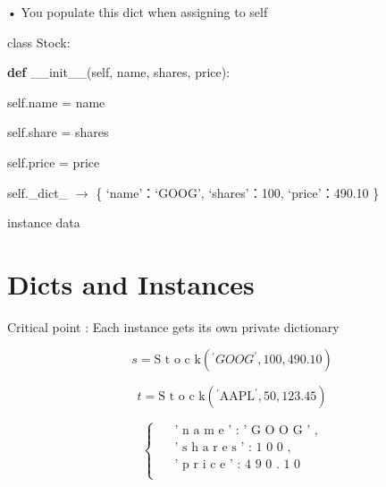 \documentclass[
  letterpaper,
  DIV=11,
  numbers=noendperiod]{scrreprt}
\newenvironment{Shaded}{\begin{snugshade}}{\end{snugshade}}
\newcommand{\FunctionTok}[1]{\textcolor[rgb]{0.28,0.35,0.67}{#1}}
\newcommand{\KeywordTok}[1]{\textcolor[rgb]{0.00,0.23,0.31}{\textbf{#1}}}
\newcommand{\NormalTok}[1]{\textcolor[rgb]{0.00,0.23,0.31}{#1}}
\newcommand{\VariableTok}[1]{\textcolor[rgb]{0.07,0.07,0.07}{#1}}
\begin{document}
• You populate this dict when assigning to self

class Stock:

\begin{Shaded}
\begin{Highlighting}[]
\KeywordTok{def} \FunctionTok{\_\_init\_\_}\NormalTok{(}\VariableTok{self}\NormalTok{, name, shares, price): }
\end{Highlighting}
\end{Shaded}

\begin{Shaded}
\begin{Highlighting}[]
\NormalTok{self.name = name }
\end{Highlighting}
\end{Shaded}

\begin{Shaded}
\begin{Highlighting}[]
\NormalTok{self.share = shares }
\end{Highlighting}
\end{Shaded}

\begin{Shaded}
\begin{Highlighting}[]
\NormalTok{self.price = price }
\end{Highlighting}
\end{Shaded}

self.\_dict\_ \(\longrightarrow\) \{ `name'：`GOOG', `shares'：100,
`price'：490.10 \}

instance data


\chapter{Dicts and Instances}\label{dicts-and-instances-1}

Critical point : Each instance gets its own private dictionary

\[
s = \text {S t o c k} \left(^ {\prime} G O O G ^ {\prime}, 1 0 0, 4 9 0. 1 0\right)
\]

\[
t = \text {S t o c k} \left(^ {\prime} \mathrm {A A P L} ^ {\prime}, 5 0, 1 2 3. 4 5\right)
\]

\[
\left\{ \begin{array}{l} \quad \text { ' n a m e ' : ' G O O G ' ,} \\ \quad \text { ' s h a r e s ' : 1 0 0 ,} \\ \quad \text { ' p r i c e ' : 4 9 0 . 1 0} \\ \end{array} \right.
\]
\end{document}
